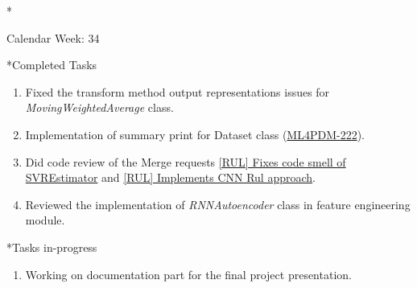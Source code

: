 \documentclass[11pt,a4paper]{article}
\begin{document}
\newpage
\begin{section}*{Calendar Week: 34 \hfill \date{27 August, 2021}}
 \begin{subsection}*{Completed Tasks}
     \begin{enumerate}
         \item Fixed the transform method output representations issues for \textit{MovingWeightedAverage} class.
         \item Implementation of summary print for Dataset class (\href{https://ml4pdm.atlassian.net/browse/ML4PDM-22}{ML4PDM-222}).
         \item Did code review of the Merge requests \href{https://git.cs.uni-paderborn.de/machine-learning-for-predictive-maintenance/code/-/merge_requests/44}{[RUL] Fixes code smell of SVREstimator} and \href{https://git.cs.uni-paderborn.de/machine-learning-for-predictive-maintenance/code/-/merge_requests/43}{[RUL] Implements CNN Rul approach}.
         \item Reviewed the implementation of \textit{RNNAutoencoder} class in feature engineering module.
     \end{enumerate}
 \end{subsection}
 \begin{subsection}*{Tasks in-progress}
     \begin{enumerate}
         \item Working on documentation part for the final project presentation.
     \end{enumerate}
 \end{subsection}
\end{section}
\end{document}

